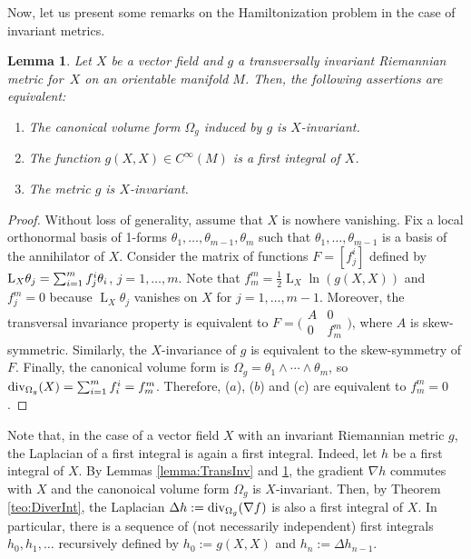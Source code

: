 \documentclass[10pt,a4paper]{amsart}
\numberwithin{equation}{section}
\newtheorem{Lemma}[Theorem]{Lemma}
\begin{document}
Now, let us present some remarks on the Hamiltonization problem in the case of invariant metrics.

\begin{Lemma}\label{lemma:MetricXinv}
Let $X$ be a vector field and $g$ a transversally invariant Riemannian metric for~$X$ on an orientable manifold $M$. Then, the following assertions are equivalent:
 \begin{enumerate}\itemsep=0pt
 \item[$(a)$] The canonical volume form $\Omega_{g}$ induced by $g$ is $X$-invariant.
 \item[$(b)$] The function $g(X,X)\in C^{\infty}(M)$ is a first integral of $X$.
 \item[$(c)$] The metric $g$ is $X$-invariant.
 \end{enumerate}
\end{Lemma}
\begin{proof}
Without loss of generality, assume that $X$ is nowhere vanishing. Fix a local orthonormal basis of 1-forms $\theta_1,\dots,\theta_{m-1},\theta_{m}$ such that $\theta_1,\dots,\theta_{m-1}$ is a basis of the annihilator of $X$. Consider the matrix of functions $F=[f^{i}_{j}]$ defined by ${\rm L}_{X}\theta_{j}=\sum_{i=1}^{m}f^{i}_{j}\theta_{i}$, $j=1,\dots,m$. Note that $f^{m}_{m}=\tfrac{1}{2}\operatorname{L}_{X}\ln(g(X,X))$ and $f^{m}_{j}=0$ because $\operatorname{L}_{X}\theta_{j}$ vanishes on $X$ for $j=1,\dots,m-1$. Moreover, the transversal invariance property is equivalent to
$F = \big(\begin{smallmatrix}
 A & 0 \\
 0 & f^{m}_{m}
 \end{smallmatrix}\big)$,
where $A$ is skew-symmetric. Similarly, the $X$-invariance of $g$ is equivalent to the skew-symmetry of $F$. Finally, the canonical volume form is $\Omega_{g}=\theta_1\wedge\cdots\wedge\theta_{m}$, so ${\rm div}_{\Omega_{g}}(X)=\sum_{i=1}^{m}f^{i}_{i} = f^{m}_{m}$. Therefore, ($a$), ($b$) and ($c$) are equivalent to $f^{m}_{m}=0$.
\end{proof}

Note that, in the case of a vector field $X$ with an invariant Riemannian metric $g$, the Laplacian of a first integral is again a first integral. Indeed, let $h$ be a first integral of $X$. By Lemmas \ref{lemma:TransInv} and \ref{lemma:MetricXinv}, the gradient $\nabla h$ commutes with $X$ and the canonoical volume form $\Omega_{g}$ is $X$-invariant. Then, by Theorem \ref{teo:DiverInt}, the Laplacian $\Delta h := {\rm div}_{\Omega_{g}}(\nabla f)$ is also a first integral of $X$. In particular, there is a sequence of (not necessarily independent) first integrals $h_0,h_1,\dots$ recursively defined by $h_0:=g(X,X)$ and $h_n:=\Delta h_{n-1}$.
\end{document}
